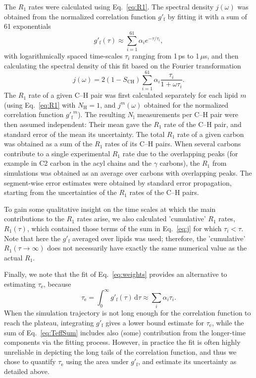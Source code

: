 \documentclass[journal=jcisd8,manuscript=article,layout=twocolumn]{achemso}
\begin{document}
The $R_{1}$ rates were calculated using Eq.~\eqref{eq:R1}.
%
The spectral density $j(\omega)$ was obtained from the normalized correlation function $g'_\mathrm f$
by fitting it with a sum of 61 exponentials
\begin{equation}
\label{eq:weights}
g'_\mathrm{f}(\tau)\approx\sum_{i=1}^{61}\alpha_{i}e^{-\tau/\tau_{i}},
\end{equation}
with logarithmically spaced time-scales $\tau_{i}$ ranging from 1\,ps to 1\,$\mu$s, 
and then calculating the spectral density of this fit
based on the Fourier transformation\cite{ferreira15}
\begin{equation}
\label{eq:j}
j{(\omega)}=2(1-S_\mathrm{CH})\sum_{i=1}^{61}\alpha_{i}\frac{\tau_{i}}{1+\omega\tau_{i}} .
\end{equation}
%
The $R_{1}$ rate of a given C--H pair was
first calculated separately for each lipid $m$ (using Eq.~\eqref{eq:R1} with $N_\mathrm{H}=1$, and $j^m(\omega)$ obtained for the normalized correlation function ${g'_\mathrm f}^m$). The resulting $N_\mathrm{l}$ measurements per \mbox{C--H} pair were then assumed independent:
Their mean gave the $R_1$ rate of the C--H pair, and 
standard error of the mean its uncertainty.
%
The total $R_1$ rate of a given carbon was obtained as a sum of the $R_1$ rates of its C--H pairs.
%
When several carbons contribute to a single experimental $R_1$ rate due to the overlapping peaks (for example in C2 carbon in the acyl chains and the $\gamma$ carbons),
the $R_1$ from simulations was obtained as an average over carbons with overlapping peaks.
%
The segment-wise error estimates were obtained by standard error propagation, starting from the uncertainties of the $R_1$ rates of the C--H pairs.

To gain some qualitative insight on the time scales at which the main contributions to the $R_{1}$ rates arise,
we also calculated 'cumulative' $R_1$ rates, $R_1(\tau)$, which contained those terms of the sum in Eq.~\eqref{eq:j} for which $\tau_i<\tau$.
Note that here the $g'_\mathrm{f}$ averaged over lipids was used;
therefore, the 'cumulative' $R_1(\tau\to\infty)$ does not necessarily have exactly
the same numerical value as the actual $R_1$.

Finally, we note that the fit of Eq.~\eqref{eq:weights} provides an alternative
to estimating $\tau_\mathrm{e}$, because
\begin{equation}
\label{eq:TeffSum}
\tau_\mathrm{e}
	=\int_0^\infty\!g'_\mathrm f(\tau)\,\mathrm d\tau
	\approx\sum_{i}\alpha_{i}\tau_{i}.
\end{equation}
When the simulation trajectory is not long enough for the correlation function to reach the plateau, integrating $g'_\mathrm f$ gives a lower bound estimate for $\tau_\mathrm{e}$, while the sum of Eq.~\eqref{eq:TeffSum} includes also (some) contribution from the longer-time components via the fitting process.
However, in practice the fit is often highly unreliable in depicting the long tails of the correlation function, and thus we chose to quantify $\tau_\mathrm{e}$ using the area under $g'_\mathrm f$, and estimate its uncertainty as detailed above.
\end{document}
